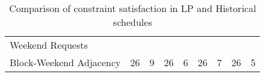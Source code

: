 \begin{table}[h]
\begin{tabular}{l|cc|cc|cc|cc}
    	Weekend Requests                                             &            &                       &            &                       &            &                       &            &                      \\
    	Block-Weekend Adjacency                                      &     26     &           9           &     26     &           6           &     26     &           7           &     26     &          5
    \end{tabular}%
	\caption{Comparison of constraint satisfaction in LP and Historical schedules}
	\label{tbl:constraints-comparison}%
\end{table}%
